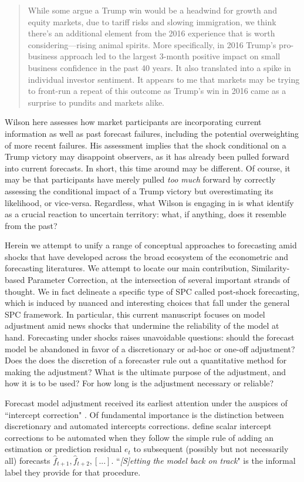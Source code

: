 \documentclass[11pt]{article}
\theoremstyle{definition}
\begin{document}
\begin{quote}While some argue a Trump win would be a headwind for growth and equity markets, due to tariff  risks and slowing immigration, we think there's an additional element from the 2016 experience that  is worth considering—rising animal spirits. More specifically, in 2016 Trump's pro-business approach  led to the largest 3-month positive impact on small business confidence in the past 40 years. It also translated into a spike in individual investor sentiment. It appears to me that markets may be trying  to front-run a repeat of this outcome as Trump's win in 2016 came as a surprise to pundits and  markets alike.
\end{quote}
Wilson here assesses how market participants are incorporating current information as well as past forecast failures, including the potential overweighting of more recent failures.  His assessment implies that the shock conditional on a Trump victory may disappoint observers, as it has already been pulled forward into current forecasts.  In short, this time around may be different.  Of course, it may be that participants have merely pulled \textit{too much} forward by correctly assessing the conditional impact of a Trump victory but overestimating its likelihood, or vice-versa.  Regardless, what Wilson is engaging in is what \cite{lundquist2024volatility} identify as a crucial reaction to uncertain territory: what, if anything, does it resemble from the past?

Herein we attempt to unify a range of conceptual approaches to forecasting amid shocks that have developed across the broad ecosystem of the econometric and forecasting literatures.  We attempt to locate our main contribution, Similarity-based Parameter Correction, at the intersection of several important strands of thought.  We in fact delineate a specific type of SPC called post-shock forecasting, which is induced by nuanced and interesting choices that fall under the general SPC framework.  In particular, this current manuscript focuses on model adjustment amid news shocks that undermine the reliability of the  model at hand.  Forecasting under shocks raises unavoidable questions: should the forecast model be abandoned in favor of a discretionary or ad-hoc or one-off adjustment?  Does the does the discretion of a forecaster rule out a quantitative method for making the adjustment?  What is the ultimate purpose of the adjustment, and how it is to be used?  For how long is the adjustment necessary or reliable?

Forecast model adjustment received its earliest attention under the auspices of ``intercept correction" \citep{hendry1994theory,clements1996intercept,clements1998forecasting, clements1999forecasting}.  Of fundamental importance is the distinction between discretionary and automated intercepts corrections. \cite{hendry1994theory} define scalar intercept corrections to be automated when they follow the simple rule of adding an estimation or prediction residual $e_{t}$ to subsequent (possibly but not necessarily all) forecasts $\hat f_{t+1},\hat f_{t+2},[...].$ ``\textit{[S]etting the model back on track}" is the informal label they provide for that procedure. 
 
\end{document}
